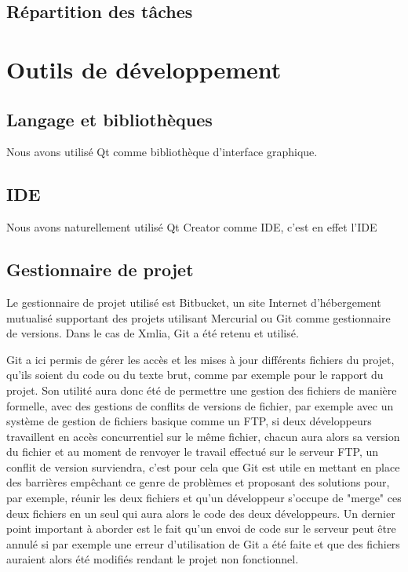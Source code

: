         \subsection{Répartition des tâches}

\section{Outils de développement}

\subsection{Langage et bibliothèques}

Nous avons utilisé Qt comme bibliothèque d'interface graphique. 

\subsection{IDE}
Nous avons naturellement utilisé Qt Creator comme IDE, c'est en effet l'IDE 

        \subsection{Gestionnaire de projet}
        Le gestionnaire de projet utilisé est Bitbucket, un site Internet d'hébergement mutualisé supportant des projets utilisant Mercurial ou Git comme gestionnaire de versions. Dans le cas de Xmlia, Git a été retenu et utilisé.
        
        Git a ici permis de gérer les accès et les mises à jour différents fichiers du projet, qu'ils soient du code ou du texte brut, comme par exemple pour le rapport du projet. Son utilité aura donc été de permettre une gestion des fichiers de manière formelle, avec des gestions de conflits de versions de fichier, par exemple avec un système de gestion de fichiers basique comme un FTP, si deux développeurs travaillent en accès concurrentiel sur le même fichier, chacun aura alors sa version du fichier et au moment de renvoyer le travail effectué sur le serveur FTP, un conflit de version surviendra, c'est pour cela que Git est utile en mettant en place des barrières empêchant ce genre de problèmes et proposant des solutions pour, par exemple, réunir les deux fichiers et qu'un développeur s'occupe de "merge" ces deux fichiers en un seul qui aura alors le code des deux développeurs. Un dernier point important à aborder est le fait qu'un envoi de code sur le serveur peut être annulé si par exemple une erreur d'utilisation de Git a été faite et que des fichiers auraient alors été modifiés rendant le projet non fonctionnel.
       
